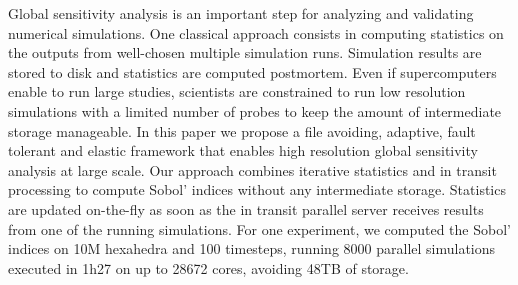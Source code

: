 \license


Global sensitivity analysis is an important step for analyzing and validating numerical simulations. One classical approach consists in computing statistics on the outputs from well-chosen multiple simulation runs. Simulation results are stored to disk and statistics are computed postmortem. Even if supercomputers enable to run large studies, scientists are constrained to run low resolution simulations with a limited number of probes to keep the amount of intermediate storage manageable. In this paper we propose a file avoiding, adaptive, fault tolerant and elastic framework that enables high resolution global sensitivity analysis at large scale. Our approach combines iterative statistics and in transit processing to compute Sobol’ indices without any intermediate storage. Statistics are updated on-the-fly as soon as the in transit parallel server receives results from one of the running simulations. For one experiment, we computed the Sobol’ indices on 10M hexahedra and 100 timesteps, running 8000 parallel simulations executed in 1h27 on up to 28672 cores, avoiding 48TB of storage.

